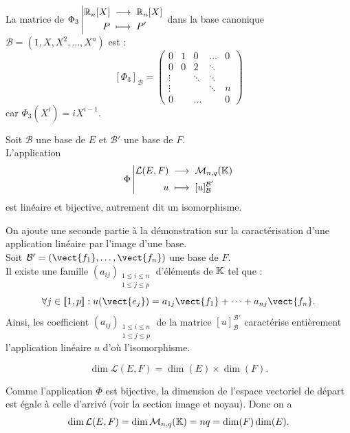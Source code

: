 \documentclass{book}
\begin{document}
\begin{Exemple} La matrice de ${\Phi _3}\left|\begin{aligned}{\mathbb {R}_n[X] }&\;\longrightarrow\;{\mathbb {R}_n[X]}\\{P}&\;\longmapsto\;{P'}\end{aligned}\right.$ dans la base canonique $\mathcal{B}=(1,X,X^2,\dots,X^n)$ est :
 $$[\Phi _3]_{\mathcal{B}}= \begin{pmatrix} 0 &1&0&\ldots &0 \\
 0& 0&2&\ddots \\
 \vdots &  &\ddots & \ddots \\
  \vdots &  & & \ddots& n\\
 0 &  & \dots& & 0
\end{pmatrix}   $$
car $\Phi _3(X^i)=i X^{i-1}$.
\end{Exemple}
\begin{Theoreme}[Dualité]
Soit $\mathcal{B}$ une base de $E$ et $\mathcal{B}'$ une base de $F$.\\
L'application
\[ {\Phi}\left|\begin{aligned}{\mathcal{L}(E,F)}&\;\longrightarrow\;{\mathcal{M}_{n,q}(\mathbb{K}) }\\{u}&\;\longmapsto\;{[u]_\mathcal{B}^{\mathcal{B}'}}\end{aligned}\right. \]
est linéaire et bijective, autrement dit un isomorphisme.
\end{Theoreme}
\begin{Demonstration}
On ajoute une seconde partie à la démonstration sur la caractérisation d'une application linéaire par l'image d'une base.\\
Soit $\mathcal{B}'=(\vect{f_1},\dots,\vect{f_n})$ une base de $F$.\\
Il existe une famille $(a_{ij})_{\substack{1\leq i\leq n\\1\leq j\leq p}}$ d'éléments de $\mathbb{K}$ tel que :
$$\forall j\in \Intf{1}{p}: u(\vect{e_j})=a_{1j}\vect{f_1}+\dots+a_{nj}\vect{f_n}.$$ 
Ainsi, les coefficient $(a_{ij})_{\substack{1\leq i\leq n\\1\leq j\leq p}}$ de la matrice $[u]_\mathcal{B}^{\mathcal{B}'}$   caractérise entièrement l'application linéaire $u$ d'où l'isomorphisme. 
\end{Demonstration}

\begin{Corollaire}
$$\dim \mathcal{L}(E,F) = \dim(E) \times\dim(F).$$
\end{Corollaire}
\begin{Demonstration}
Comme l'application $\Phi$ est bijective, la dimension de l'espace vectoriel de départ est égale à celle d'arrivé (voir la section image et noyau). Donc on a $$\dim \mathcal{L}(E,F)=\dim \mathcal{M}_{n,q}(\mathbb{K})= n q= \dim (F)\dim (E).$$ 
\end{Demonstration}
\end{document}
